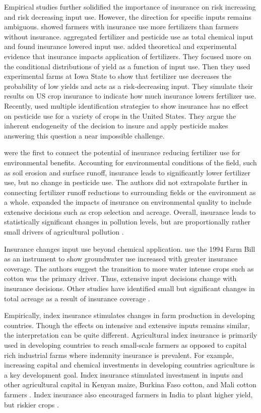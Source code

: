 \documentclass[
  super,
  preprint,
  3p]{elsarticle}
\theoremstyle{plain}
\theoremstyle{plain}
\theoremstyle{remark}
\begin{document}
Empirical studies further solidified the importance of insurance on risk
increasing and risk decreasing input use. However, the direction for
specific inputs remains ambiguous. \citet{horowitz1993} showed farmers
with insurance use more fertilizers than farmers without insurance.
\citet{Smith1996} aggregated fertilizer and pesticide use as total
chemical input and found insurance lowered input use.
\citet{Babcock1996} added theoretical and experimental evidence that
insurance impacts application of fertilizers. They focused more on the
conditional distributions of yield as a function of input use. Then they
used experimental farms at Iowa State to show that fertilizer use
decreases the probability of low yields and acts as a risk-decreasing
input. They simulate their results on US crop insurance to indicate how
much insurance lowers fertilizer use. Recently, \citet{Biram2024} used
multiple identification strategies to show insurance has no effect on
pesticide use for a variety of crops in the United States. They argue
the inherent endogeneity of the decision to insure and apply pesticide
makes answering this question a near impossible challenge.

\citet{Mishra2005} were the first to connect the potential of insurance
reducing fertilizer use for environmental benefits. Accounting for
environmental conditions of the field, such as soil erosion and surface
runoff, insurance leads to significantly lower fertilizer use, but no
change in pesticide use. The authors did not extrapolate further in
connecting fertilizer runoff reductions to surrounding fields or the
environment as a whole. \citet{Claassen2017} expanded the impacts of
insurance on environmental quality to include extensive decisions such
as crop selection and acreage. Overall, insurance leads to statistically
significant changes in pollution levels, but are proportionally rather
small drivers of agricultural pollution \citep{Claassen2017}.

Insurance changes input use beyond chemical application.
\citet{Deryugina2017} use the 1994 Farm Bill as an instrument to show
groundwater use increased with greater insurance coverage. The authors
suggest the transition to more water intense crops such as cotton was
the primary driver. Thus, extensive input decisions change with
insurance decisions. Other studies have identified small but significant
changes in total acreage as a result of insurance coverage
\citep{Goodwin2004, Cai2016}.

Empirically, index insurance stimulates changes in farm production in
developing countries. Though the effects on intensive and extensive
inputs remains similar, the interpretation can be quite different.
Agricultural index insurance is primarily used in developing countries
to reach small-scale farmers as opposed to capital rich industrial farms
where indemnity insurance is prevalent. For example, increasing capital
and chemical investments in developing countries agriculture is a key
development goal. Index insurance stimulated investment in inputs and
other agricultural capital in Kenyan maize, Burkina Faso cotton, and
Mali cotton farmers \citep{Sibiko2020, stoeffler2022, Elabed2016}. Index
insurance also encouraged farmers in India to plant higher yield, but
riskier crops \citep{Cole2017}.
\end{document}
